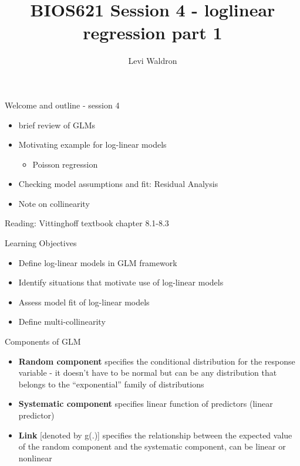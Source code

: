 \documentclass[ignorenonframetext,]{beamer}
\title{BIOS621 Session 4 - loglinear regression part 1}
\author{Levi Waldron}
\date{}
\providecommand{\tightlist}{%
  \setlength{\itemsep}{0pt}\setlength{\parskip}{0pt}}
\begin{document}
\frame{\titlepage}

\begin{frame}{Welcome and outline - session 4}

\begin{itemize}
\tightlist
\item
  brief review of GLMs
\item
  Motivating example for log-linear models

  \begin{itemize}
  \tightlist
  \item
    Poisson regression
  \end{itemize}
\item
  Checking model assumptions and fit: Residual Analysis
\item
  Note on collinearity
\end{itemize}

Reading: Vittinghoff textbook chapter 8.1-8.3

\end{frame}

\begin{frame}{Learning Objectives}

\begin{itemize}
\tightlist
\item
  Define log-linear models in GLM framework
\item
  Identify situations that motivate use of log-linear models
\item
  Assess model fit of log-linear models
\item
  Define multi-collinearity
\end{itemize}

\end{frame}

\begin{frame}{Components of GLM}

\begin{itemize}
\tightlist
\item
  \textbf{Random component} specifies the conditional distribution for
  the response variable - it doesn't have to be normal but can be any
  distribution that belongs to the ``exponential'' family of
  distributions
\item
  \textbf{Systematic component} specifies linear function of predictors
  (linear predictor)
\item
  \textbf{Link} {[}denoted by g(.){]} specifies the relationship between
  the expected value of the random component and the systematic
  component, can be linear or nonlinear
\end{itemize}

\end{frame}
\end{document}
